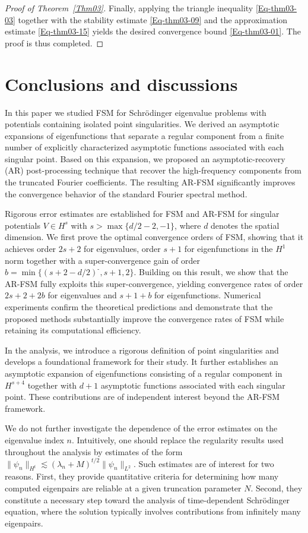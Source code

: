 \documentclass{sn-jnl}%
\newcommand{\m}{\textbf{-}}
\numberwithin{equation}{section}
\theoremstyle{thmstyleone}%
\theoremstyle{thmstyletwo}%
\theoremstyle{thmstylethree}%
\begin{document}
\begin{proof}[Proof of Theorem~\ref{Thm03}]
    Finally, applying the triangle inequality \eqref{Eq-thm03-03} together with the stability estimate \eqref{Eq-thm03-09} and the approximation estimate \eqref{Eq-thm03-15} yields the desired convergence bound \eqref{Eq-thm03-01}. The proof is thus completed.
\end{proof}

\section{Conclusions and discussions}
\label{sec:conclusions}
In this paper we studied FSM for Schr\"{o}dinger eigenvalue problems with potentials containing isolated point singularities. We derived an asymptotic expansions of eigenfunctions that separate a regular component from a finite number of explicitly characterized asymptotic functions associated with each singular point.
Based on this expansion, we proposed an asymptotic-recovery (AR) post-processing technique that recover the  high-frequency components from the truncated Fourier coefficients. The resulting AR-FSM significantly improves the convergence behavior of the standard Fourier spectral method. 

Rigorous error estimates are established for FSM and AR-FSM for singular potentials $V \in H^{s}$ with $s > \max\{d/2-2,-1\}$, where $d$ denotes the spatial dimension. We first prove the optimal convergence orders of  FSM, showing that it achieves order $2s+2$ for eigenvalues, order $s+1$ for eigenfunctions in the $H^1$ norm together with a super-convergence gain of order $b=\min\{(s+2-d/2)^{\m},s+1,2\}$. Building on this result, we show that the AR-FSM fully exploits this super-convergence, yielding convergence rates of order $2s+2+2b$ for eigenvalues and $s+1+b$ for eigenfunctions. Numerical experiments confirm the theoretical predictions and demonstrate that the proposed methods substantially improve the convergence rates of FSM while retaining its computational efficiency.

In the analysis, we introduce a rigorous definition of point singularities and develops a foundational framework for their study. It further establishes an asymptotic expansion of eigenfunctions consisting of a
regular component in $H^{s+4}$ together with $d+1$ asymptotic functions associated with each singular point. These contributions are of independent interest beyond the AR-FSM framework.

We do not further investigate the dependence of the error estimates on the eigenvalue index $n$. Intuitively, one should replace the regularity results used throughout the analysis by estimates of the form
$\|\psi_n\|_{H^{t}}\lesssim (\lambda_n+M)^{t/2}\|\psi_n\|_{L^2}$. 
Such estimates are of interest for two reasons. First, they provide quantitative criteria for determining how many computed eigenpairs are reliable at a given truncation parameter $N$. Second, they constitute a necessary step toward the analysis of time-dependent Schr\"odinger equation, where the solution typically involves contributions from infinitely many eigenpairs.
\end{document}
